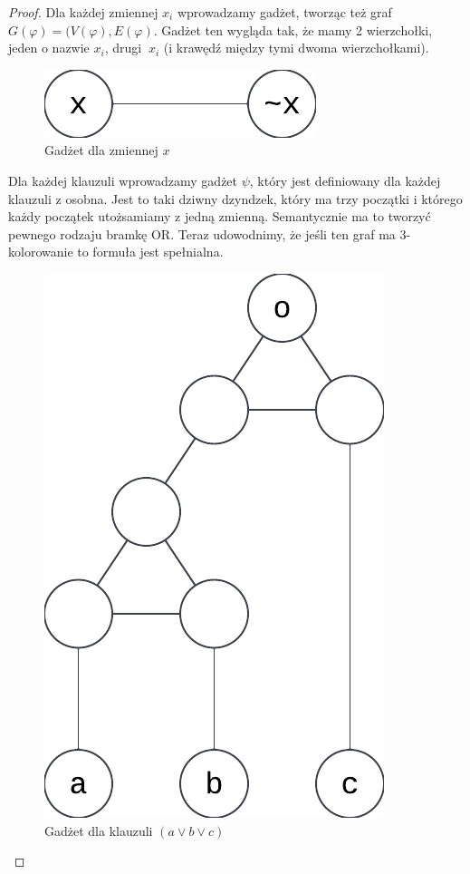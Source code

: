 \begin{proof}
	Dla każdej zmiennej $x_i$ wprowadzamy gadżet, tworząc też graf $G(\varphi) = (V(\varphi), E(\varphi)$. Gadżet ten wygląda tak, że mamy 2 wierzchołki, jeden o nazwie $x_i$, drugi $~x_i$ (i krawędź między tymi dwoma wierzchołkami).

	\begin{figure}[H]
		\centering
		\includegraphics{img/3-coloring-variable-gadget.png}
		\caption{Gadżet dla zmiennej \( x \)}
	\end{figure}

	Dla każdej klauzuli wprowadzamy gadżet $\psi $, który jest definiowany dla każdej klauzuli z osobna. Jest to taki dziwny dzyndzek, który ma trzy początki i którego każdy początek utożsamiamy z jedną zmienną. Semantycznie ma to tworzyć pewnego rodzaju bramkę OR. Teraz udowodnimy, że jeśli ten graf ma 3-kolorowanie to formuła jest spełnialna.

	\begin{figure}[H]
		\centering
		\includegraphics{img/3-coloring-clause-gadget.png}
		\caption{Gadżet dla klauzuli \((a \lor b \lor c) \)}
	\end{figure}


\end{proof}
